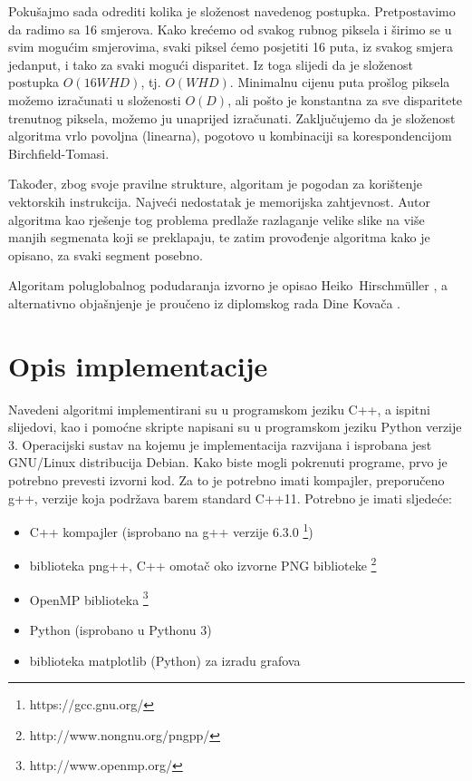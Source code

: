 \documentclass[utf8, zavrsni, numeric]{fer}
\begin{document}
Pokušajmo sada odrediti kolika je složenost navedenog postupka. Pretpostavimo da radimo sa 16 smjerova. Kako krećemo od svakog rubnog piksela i širimo se u svim mogućim smjerovima, svaki
piksel ćemo posjetiti 16 puta, iz svakog smjera jedanput, i tako za svaki mogući disparitet. Iz toga slijedi da je složenost postupka $O(16WHD)$, tj. $O(WHD)$.
Minimalnu cijenu puta prošlog piksela možemo izračunati u složenosti $O(D)$, ali pošto je konstantna za sve disparitete trenutnog piksela, možemo ju unaprijed izračunati. Zaključujemo da je složenost algoritma vrlo povoljna (linearna), pogotovo u kombinaciji sa korespondencijom Birchfield-Tomasi.

Također, zbog svoje pravilne strukture, algoritam je pogodan za korištenje vektorskih instrukcija. Najveći nedostatak je memorijska zahtjevnost. Autor algoritma kao rješenje tog problema predlaže
razlaganje velike slike na više manjih segmenata koji se preklapaju, te zatim provođenje algoritma kako je opisano, za svaki segment posebno.

Algoritam poluglobalnog podudaranja izvorno je opisao Heiko~Hirschm{\"u}ller \cite{hirschmuller2008stereo}, a alternativno objašnjenje je proučeno iz diplomskog rada Dine Kovača \cite{kovac15ms}.

\chapter{Opis implementacije}

Navedeni algoritmi implementirani su u programskom jeziku C++, a ispitni slijedovi, kao i pomoćne skripte napisani su u programskom jeziku Python verzije 3.
Operacijski sustav na kojemu je implementacija razvijana i isprobana jest GNU/Linux distribucija Debian.
Kako biste mogli pokrenuti programe, prvo je potrebno prevesti izvorni kod. Za to je potrebno imati kompajler, preporučeno g++, verzije koja podržava barem standard C++11.
Potrebno je imati sljedeće:
\begin{itemize}
\item C++ kompajler (isprobano na g++ verzije 6.3.0 \footnote{https://gcc.gnu.org/})
\item biblioteka png++, C++ omotač oko izvorne PNG biblioteke \footnote{http://www.nongnu.org/pngpp/}
\item OpenMP biblioteka \footnote{http://www.openmp.org/}
\item Python (isprobano u Pythonu 3)
\item biblioteka matplotlib (Python) za izradu grafova
\end{itemize}
\end{document}

